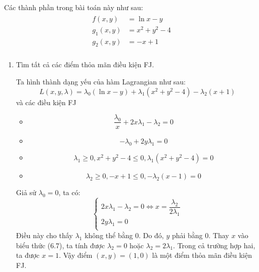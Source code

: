 \begin{solution}

    Các thành phần trong bài toán này như sau:
    \begin{align}
        \begin{aligned}
            f(x,y) &= \ln x - y\\
            g_1(x,y) &= x^2 + y^2 - 4\\
            g_2(x, y) &= -x + 1\\
        \end{aligned}
    \end{align}

    \begin{enumerate}[label=(\alph*)]
        \item Tìm tất cả các điểm thỏa mãn điều kiện FJ. 

        Ta hình thành dạng yếu của hàm Lagrangian như sau:
        \begin{equation}
            L(x, y, \lambda) = \lambda_0(\ln x - y) + \lambda_1(x^2 + y^2 - 4) - \lambda_2(x + 1)
        \end{equation}
        và các điều kiện FJ
        \begin{itemize}
            \item \begin{equation}
                \dfrac{\lambda_0}{x} + 2x\lambda_1 - \lambda_2 = 0
            \end{equation}
            \item \begin{equation}
                -\lambda_0 + 2y\lambda_1 = 0
            \end{equation}
            \item \begin{equation}
                \lambda_1 \geq 0, x^2 + y^2 - 4 \leq 0, \lambda_1(x^2 + y^2 - 4) = 0
            \end{equation}
            \item \begin{equation}
                \lambda_2 \geq 0, -x + 1 \leq 0, -\lambda_2(x-1) = 0
            \end{equation}
        \end{itemize}
        Giả sử $\lambda_0 = 0$, ta có:
        \begin{equation}
            \begin{cases}
                2x\lambda_1 - \lambda_2 = 0 \Leftrightarrow x = \dfrac{\lambda_2}{2\lambda_1}\\
                2y\lambda_1 = 0\\
            \end{cases}
        \end{equation}
        Điều này cho thấy $\lambda_1$ không thể bằng 0. Do đó, $y$ phải bằng 0. Thay $x$ vào biểu thức (6.7), ta tính được $\lambda_2 = 0$ hoặc $\lambda_2 = 2\lambda_1$. Trong cả trường hợp hai, ta được $x = 1$. Vậy điểm $(x, y) = (1, 0)$ là một điểm thỏa mãn điều kiện FJ. 
        

\end{enumerate}
\end{solution}
